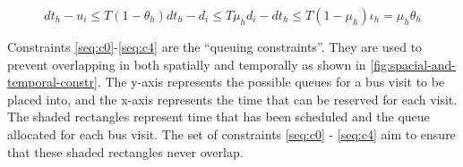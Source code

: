 \documentclass[11pt,a4paper,final]{article}
\begin{document}
\begin{multicols}{2}
\begin{subequations}
  \begin{equation}
      \label{seq:c14}
      dt_h - u_i \le T(1 - \theta_h)
  \end{equation}
  \begin{equation}
      \label{seq:c15}
      dt_h - d_i \le T\mu_h
  \end{equation}
  \begin{equation}
      \label{seq:c16}
      d_i - dt_h \le T(1 - \mu_h)
  \end{equation}
  \begin{equation}
      \label{seq:c17}
      \iota_h = \mu_h \theta_h
  \end{equation}
\end{subequations}
\label{eq:constraints}
\end{multicols}

Constraints \ref{seq:c0}-\ref{seq:c4} are the ``queuing constraints''. They are used to prevent overlapping in both
spatially and temporally as shown in \ref{fig:spacial-and-temporal-constr}. The y-axis represents the possible queues for a
bus visit to be placed into, and the x-axis represents the time that can be reserved for each visit. The shaded
rectangles represent time that has been scheduled and the queue allocated for each bus visit. The set of constraints
\ref{seq:c0} - \ref{seq:c4} aim to ensure that these shaded rectangles never overlap.
\end{document}
